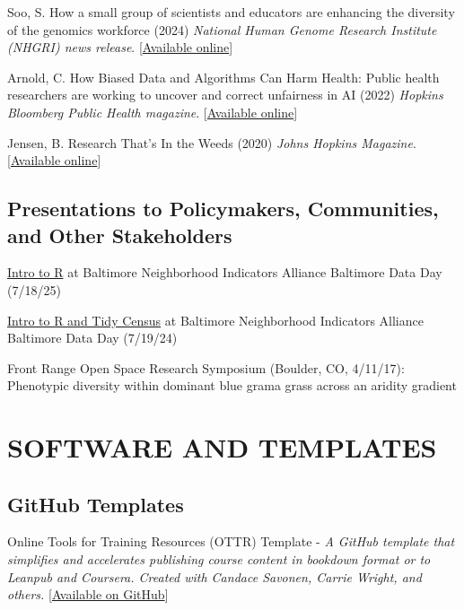 \documentclass{cv}
\begin{document}
Soo, S. How a small group of scientists and educators are enhancing the diversity of the genomics workforce (2024) \textit{National Human Genome Research Institute (NHGRI) news release}. [\href{https://www.genome.gov/news/news-release/how-a-small-group-of-scientists-and-educators-are-enhancing-the-diversity-of-the-genomics-workforce}{Available online}]

Arnold, C. How Biased Data and Algorithms Can Harm Health: Public health researchers are working to uncover and correct unfairness in AI (2022) \textit{Hopkins Bloomberg Public Health magazine}. [\href{https://magazine.publichealth.jhu.edu/2022/how-biased-data-and-algorithms-can-harm-health}{Available online}]

Jensen, B. Research That's In the Weeds (2020) \textit{Johns Hopkins Magazine}. [\href{https://hub.jhu.edu/magazine/2020/winter/ava-hoffman-urban-ecology/}{Available online}]

\subsection*{Presentations to Policymakers, Communities, and Other Stakeholders}

\href{https://www.avahoffman.com/BDD25/}{Intro to R} at Baltimore Neighborhood Indicators Alliance Baltimore Data Day (7/18/25)

\href{https://www.avahoffman.com/BDD24/}{Intro to R and Tidy Census} at Baltimore Neighborhood Indicators Alliance Baltimore Data Day (7/19/24)

Front Range Open Space Research Symposium (Boulder, CO, 4/11/17): Phenotypic diversity within dominant blue grama grass across an aridity gradient


\section*{SOFTWARE AND TEMPLATES}

\subsection*{GitHub Templates}

Online Tools for Training Resources (OTTR) Template - \textit{A GitHub template that simplifies and accelerates publishing course content in bookdown format or to Leanpub and Coursera. Created with Candace Savonen, Carrie Wright, and others.} [\href{https://github.com/jhudsl/OTTR_Template}{Available on GitHub}]
\end{document}
